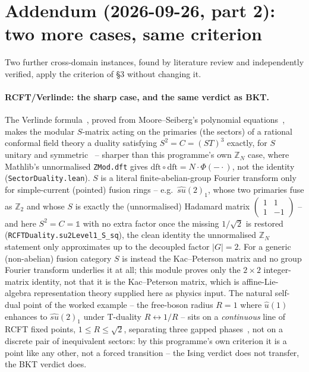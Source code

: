 \documentclass[11pt,a4paper]{article}
\newcommand{\lean}[1]{\texttt{\small #1}}
\begin{document}
\section*{Addendum (2026-09-26, part 2): two more cases, same criterion}
Two further cross-domain instances, found by literature review and independently verified, apply the criterion of
\S3 without changing it.

\paragraph{RCFT/Verlinde: the sharp case, and the same verdict as BKT.} The Verlinde formula~\cite{Verlinde1988},
proved from Moore--Seiberg's polynomial equations~\cite{MooreSeiberg1988,MooreSeiberg1989}, makes the modular
$S$-matrix acting on the primaries (the sectors) of a rational conformal field theory a duality satisfying
$S^2=C=(ST)^3$ exactly, for $S$ unitary and symmetric~\cite{Fuchs1993} -- sharper than this programme's own
$\mathbb Z_N$ case, where Mathlib's unnormalised \lean{ZMod.dft} gives $\mathrm{dft}\circ\mathrm{dft}=N\cdot
\Phi(-\cdot)$, not the identity (\lean{SectorDuality.lean}). $S$ is a literal finite-abelian-group Fourier
transform only for simple-current (pointed) fusion rings -- e.g.\ $\widehat{su}(2)_1$, whose two primaries fuse as
$\mathbb Z_2$ and whose $S$ is exactly the (unnormalised) Hadamard matrix
$\left(\begin{smallmatrix}1&1\\1&-1\end{smallmatrix}\right)$ -- and here $S^2=C=\mathbb 1$ with no extra factor
once the missing $1/\sqrt2$ is restored (\lean{RCFTDuality.su2Level1\_S\_sq}), the clean identity the unnormalised
$\mathbb Z_N$ statement only approximates up to the decoupled factor $|G|=2$. For a generic (non-abelian) fusion
category $S$ is instead the Kac--Peterson matrix and no group Fourier transform underlies it at all; this module
proves only the $2\times2$ integer-matrix identity, not that it is the Kac--Peterson matrix, which is affine-Lie-
algebra representation theory supplied here as physics input. The natural self-dual point of the worked example --
the free-boson radius $R=1$ where $\hat u(1)$ enhances to $\widehat{su}(2)_1$ under T-duality $R\leftrightarrow1/R$
-- sits on a \emph{continuous} line of RCFT fixed points, $1\le R\le\sqrt2$, separating three gapped
phases~\cite{PaceChatterjeeShao2024}, not on a discrete pair of inequivalent sectors: by this programme's own
criterion it is a point like any other, not a forced transition -- the Ising verdict does not transfer, the BKT
verdict does.
\end{document}
